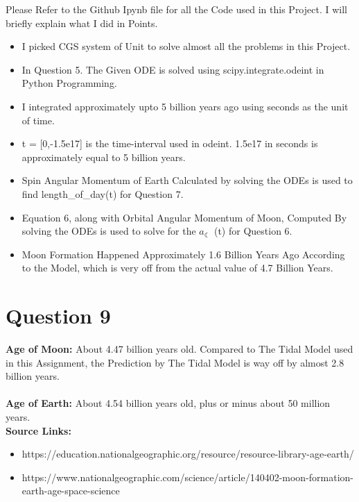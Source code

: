 \documentclass[12pt, letterpaper]{article}
\begin{document}
Please Refer to the Github Ipynb file for all the Code used in this Project. I will briefly explain what I did in Points.

\begin{itemize}
  \item I picked CGS system of Unit to solve almost all the problems in this Project.
  \item In Question 5. The Given ODE is solved using scipy.integrate.odeint in Python Programming.
  \item I integrated approximately upto 5 billion years ago using seconds as the unit of time. 
  \item t = [0,-1.5e17] is the time-interval used in odeint. 1.5e17 in seconds is approximately equal to 5 billion years.
  \item Spin Angular Momentum of Earth Calculated by solving the ODEs is used to find length\_of\_day(t) for Question 7. 
  \item Equation 6, along with Orbital Angular Momentum of Moon, Computed By solving the ODEs is used to solve for the $a_{\leftmoon}$ (t) for Question 6.  
  \item Moon Formation Happened Approximately 1.6 Billion Years Ago According to the Model, which is very off from the actual value of 4.7 Billion Years.
  
\end{itemize}

\section*{Question 9}

\textbf{Age of Moon:} About 4.47 billion years old. Compared to The Tidal Model used in this Assignment, the Prediction by The Tidal Model is way off by almost 2.8 billion years.\\ \\
\textbf{Age of Earth:} About 4.54 billion years old, plus or minus about 50 million years.\\

\textbf{Source Links:}
\begin{itemize}
    \item https://education.nationalgeographic.org/resource/resource-library-age-earth/
    \item https://www.nationalgeographic.com/science/article/140402-moon-formation-earth-age-space-science \\ \\
\end{itemize}
\end{document}
